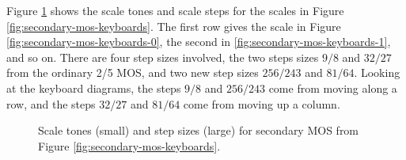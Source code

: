 \documentclass[a4paper,11pt]{article}
\begin{document}
\restoregeometry

Figure \ref{fig:secondary-mos-steps} shows the scale tones and scale steps for
the scales in Figure \ref{fig:secondary-mos-keyboards}. The first row gives the
scale in Figure \ref{fig:secondary-mos-keyboards-0}, the second in
\ref{fig:secondary-mos-keyboards-1}, and so on. There are four step sizes
involved, the two steps sizes $9/8$ and $32/27$ from the ordinary 2/5 MOS, and
two new step sizes $256/243$ and $81/64$. Looking at the keyboard diagrams, the
steps $9/8$ and $256/243$ come from moving along a row, and the steps $32/27$
and $81/64$ come from moving up a column.

\begin{figure}
\bgroup
\def\arraystretch{2}
\begin{center}

\end{center}
\egroup
\caption{Scale tones (small) and step sizes (large) for secondary MOS from
Figure \ref{fig:secondary-mos-keyboards}.\vspace{0.25cm}}
\label{fig:secondary-mos-steps}
\end{figure}
\end{document}
